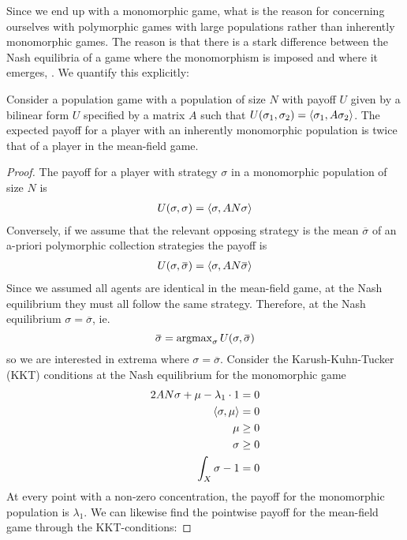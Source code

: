 Since we end up with a monomorphic game, what is the reason for concerning ourselves with polymorphic games with large populations rather than inherently monomorphic games. The reason is that there is a stark difference between the Nash equilibria of a game where the monomorphism is imposed and where it emerges, \citep{kvrivan2008ideal,collet2019algorithmic}. We quantify this explicitly:
\begin{proposition}
  \label{prop:doubleup}
  Consider a population game with a population of size $N$ with payoff $U$ given by a bilinear form $U$ specified by a matrix $A$ such that $U(\sigma_1,\sigma_2) = \left \langle \sigma_1,A \sigma_2 \right \rangle$. The expected payoff for a player with an inherently monomorphic population is twice that of a player in the mean-field game.
\end{proposition}
\begin{proof}
The payoff for a player with strategy $\sigma$ in a  monomorphic population of size $N$ is
\begin{align}
  U(\sigma,\sigma) = \left \langle \sigma,A N \sigma \right \rangle
\end{align}
Conversely, if we assume that the relevant opposing strategy is the mean $\overbar{\sigma}$ of an a-priori polymorphic collection strategies the payoff is
\begin{align}
  U(\sigma, \overbar{\sigma}) = \ip{\sigma}{AN \overbar{\sigma}}
\end{align}
Since we assumed all agents are identical in the mean-field game, at the Nash equilibrium they must all follow the same strategy. Therefore, at the Nash equilibrium $\sigma = \overbar{\sigma}$, ie.
\begin{equation}
  \overbar{\sigma} = \argmax_{\sigma} U(\sigma,\overbar{\sigma})
\end{equation}
so we are interested in extrema where $\sigma=\overbar{\sigma}$.
Consider the Karush-Kuhn-Tucker (KKT) conditions at the Nash equilibrium for the monomorphic game
\begin{align}
  \begin{split}
    2AN\sigma + \mu - \lambda_1 \cdot 1 = 0 \\
    \left \langle \sigma,\mu \right \rangle = 0 \\
    \mu \geq 0 \\
    \sigma \geq 0 \\
    \int_X \sigma - 1 = 0
  \end{split}
\end{align}
At every point with a non-zero concentration, the payoff for the monomorphic population is $\lambda_1$. We can likewise find the pointwise payoff for the mean-field game through the KKT-conditions:

\end{proof}
